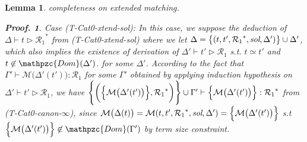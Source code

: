 \documentclass[12pt]{article}
\newtheorem{Lemma}{Lemma}[section]
\newtheorem{Proof}{Proof.}
\begin{document}
\begin{Lemma}{completeness on extended matching.}
\begin{Proof}
    Case (T-Cat0-xtend-sol): In this case, we suppose the deduction of
    $\Delta \vdash t \triangleright {\mathcal{R}_1}^*$ from
    (T-Cat0-xtend-sol) where we let
    $\Delta = \bigl\{(t, t', {\mathcal{R}_1}^*, \text{\it sol}, \Delta')
    \bigr\} \cup \Delta'$, which also implies the existence of
    derivation of $\Delta' \vdash t' \triangleright \mathcal{R}_1$ s.t.
    $t \simeq t'$ and $t \not\in \mathpzc{Dom}(\Delta')$. for some
    $\Delta'$. According to the fact that
    $\Gamma' \vdash \mathcal{M}\bigl(\Delta'(t') \bigr) : \mathcal{R}_1$
    for some $\Gamma'$ obtained by applying induction hypothesis on
    $\Delta' \vdash t' \triangleright \mathcal{R}_1$, we have
    $\Biggl\{\biggl(\Bigl\{\mathcal{M}\bigl(\Delta'(t') \bigr) \Bigr\},
    {\mathcal{R}_1}^* \biggr) \Biggr\} \cup \Gamma' \vdash \Bigl\{
    \mathcal{M}\bigl(\Delta'(t') \bigr) \Bigr\} : {\mathcal{R}_1}^*$ from
    (T-Cat0-canon-$\infty$), since
    $\mathcal{M}\bigl(\Delta(t) \bigr) =
    \mathcal{M}(t, t', {\mathcal{R}_1}^*, \text{\it sol}, \Delta') =
    \Bigl\{\mathcal{M}\bigl(\Delta'(t') \bigr) \Bigr\}$ s.t
    $\Bigl\{\mathcal{M}\bigl(\Delta'(t') \bigr) \Bigr\} \not\in
    \mathpzc{Dom}(\Gamma')$ by term size constraint.
    

\end{Proof}
\end{Lemma}
\end{document}
